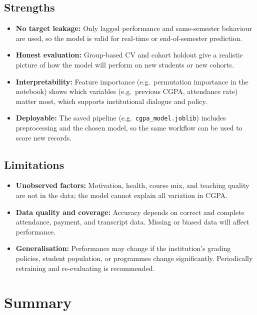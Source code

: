 \documentclass[12pt,a4paper]{article}
\begin{document}
\subsection{Strengths}

\begin{itemize}
  \item \textbf{No target leakage:} Only lagged performance and same-semester behaviour are used, so the model is valid for real-time or end-of-semester prediction.
  \item \textbf{Honest evaluation:} Group-based CV and cohort holdout give a realistic picture of how the model will perform on new students or new cohorts.
  \item \textbf{Interpretability:} Feature importance (e.g.\ permutation importance in the notebook) shows which variables (e.g.\ previous CGPA, attendance rate) matter most, which supports institutional dialogue and policy.
  \item \textbf{Deployable:} The saved pipeline (e.g.\ \texttt{cgpa\_model.joblib}) includes preprocessing and the chosen model, so the same workflow can be used to score new records.
\end{itemize}

\subsection{Limitations}

\begin{itemize}
  \item \textbf{Unobserved factors:} Motivation, health, course mix, and teaching quality are not in the data; the model cannot explain all variation in CGPA.
  \item \textbf{Data quality and coverage:} Accuracy depends on correct and complete attendance, payment, and transcript data. Missing or biased data will affect performance.
  \item \textbf{Generalisation:} Performance may change if the institution's grading policies, student population, or programmes change significantly. Periodically retraining and re-evaluating is recommended.
\end{itemize}

\section{Summary}
\end{document}
